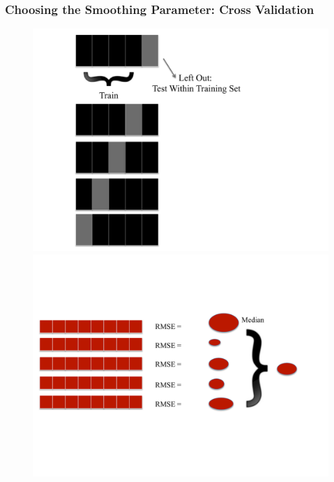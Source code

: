 \documentclass{beamer}
\begin{document}
\begin{frame}
\frametitle{Choosing the Smoothing Parameter: Cross Validation}

\begin{figure}
\includegraphics[scale=.2]{figures/kfold}
\includegraphics[scale=.28]{figures/residualsBest}
\end{figure}
\end{frame}
\end{document}
